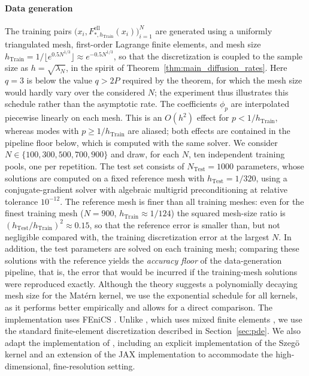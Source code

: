 \documentclass[11pt]{article}
\numberwithin{equation}{section}
\theoremstyle{plain}
\theoremstyle{definition}
\theoremstyle{remark}
\begin{document}
\paragraph{Data generation}
The training pairs $\bigl(x_i,F_{*,h_{\mathrm{Train}}}^{\mathrm{ell}}(x_i)\bigr)_{i=1}^N$ are generated using a uniformly triangulated mesh, first-order Lagrange finite elements, and mesh size $h_{\mathrm{Train}}=1/\lfloor e^{0.5N^{1/3}}\rfloor\approx{}e^{-0.5N^{1/3}}$, so that the discretization is coupled to the sample size as $h=\sqrt{\lambda_N}$, in the spirit of Theorem~\ref{thm:main_diffusion_rates}.
Here $q=3$ is below the value $q>2P$ required by the theorem, for which
the mesh size would hardly vary over the considered $N$; the experiment
thus illustrates this schedule rather than the asymptotic rate. The coefficients $\phi_p$ are interpolated piecewise linearly on each mesh. This is an $O(h^2)$ effect for $p<1/h_{\mathrm{Train}}$, whereas modes with $p\geq1/h_{\mathrm{Train}}$ are aliased; both effects are contained in the pipeline floor below, which is computed with the same solver.
We consider $N\in\{100,300,500,700,900\}$ and draw, for each $N$, ten independent training pools, one per repetition. %
The test set consists of $N_{\mathrm{Test}}=1000$ parameters, whose solutions are computed on a fixed reference mesh with $h_{\mathrm{Test}}=1/320$, using a conjugate-gradient solver with algebraic multigrid preconditioning at relative tolerance $10^{-12}$. The reference mesh is finer than all training meshes: even for the finest training mesh ($N=900$, $h_{\mathrm{Train}}\approx1/124$) the squared mesh-size ratio is $(h_{\mathrm{Test}}/h_{\mathrm{Train}})^2\approx0.15$, so that the reference error is smaller than, but not negligible compared with, the training discretization error at the largest $N$. In addition, the test parameters are solved on each training mesh; comparing these solutions with the reference yields the \emph{accuracy floor} of the data-generation pipeline, that is, the error that would be incurred if the training-mesh solutions were reproduced exactly. Although the theory suggests a polynomially decaying mesh size for the Matérn kernel, we use the exponential schedule for all kernels, as it performs better empirically and allows for a direct comparison. The implementation uses FEniCS \cite{alnaes2015fenics}. Unlike \cite{adcock2024optimal}, which uses mixed finite elements \cite{gatica2014simple}, we use the standard finite-element discretization described in Section~\ref{sec:pde}. We also adapt the implementation of \cite{batlle2024kernel}, including an explicit implementation of the Szegö kernel and an extension of the JAX implementation to accommodate the high-dimensional, fine-resolution setting.
\end{document}
